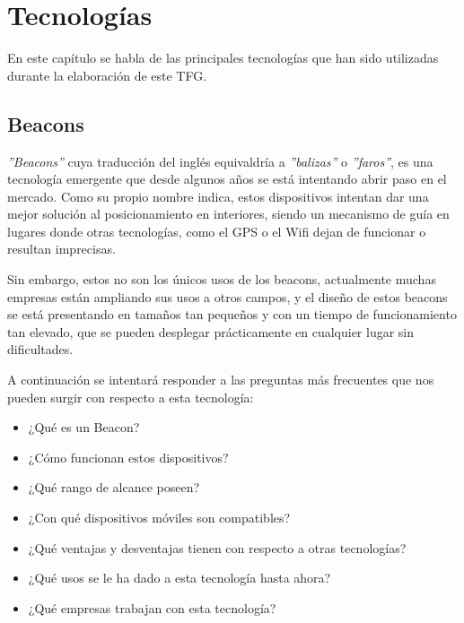 %
%
%

\cleardoublepage
\chapter{Tecnologías} \label{chap:polytopes} %

En este capítulo se habla de las principales tecnologías que han sido utilizadas durante la elaboración de este TFG.

\section{Beacons}

\textit{''Beacons''} \cite{URL::Beacon} cuya traducción del inglés equivaldría a \textit{''balizas''} o \textit{''faros''}, es una tecnología emergente que desde algunos años se está intentando abrir paso en el mercado. Como su propio nombre indica, estos dispositivos intentan dar una mejor solución al posicionamiento en interiores, siendo un mecanismo de guía en lugares donde otras tecnologías, como el GPS o el Wifi dejan de funcionar o resultan imprecisas. 

Sin embargo, estos no son los únicos usos de los beacons, actualmente muchas empresas están ampliando sus usos a otros campos, y el diseño de estos beacons se está presentando en tamaños tan pequeños y con un tiempo de funcionamiento tan elevado, que se pueden desplegar prácticamente en cualquier lugar sin dificultades.

A continuación se intentará responder a las preguntas más frecuentes que nos pueden surgir con respecto a esta tecnología:


\begin{itemize}
\item ¿Qué es un Beacon?
\item ¿Cómo funcionan estos dispositivos?
\item ¿Qué rango de alcance poseen?
\item ¿Con qué dispositivos móviles son compatibles? 
\item ¿Qué ventajas y desventajas tienen con respecto a otras tecnologías?
\item ¿Qué usos se le ha dado a esta tecnología hasta ahora?
\item ¿Qué empresas trabajan con esta tecnología?
\end{itemize}

